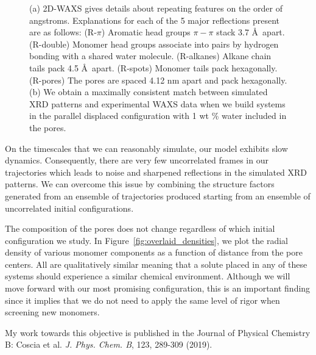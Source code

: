 \documentclass{article}
\begin{document}
\begin{figure}
\begin{subfigure}{0.49\linewidth}
	\end{subfigure}
    \caption{(a) 2D-WAXS gives details about repeating features on the order of
    angstroms. Explanations for each of the 5 major reflections present are
    as follows: (R-$\pi$) Aromatic head groups $\pi-\pi$ stack 3.7 \AA~apart. 
    (R-double) Monomer head groups associate into pairs by hydrogen bonding with
    a shared water molecule. (R-alkanes) Alkane chain tails pack 4.5 \AA~apart. 
    (R-spots) Monomer tails pack hexagonally. (R-pores) The pores are spaced 
    4.12 nm apart and pack hexagonally. (b) We obtain a maximally consistent
    match between simulated XRD patterns and experimental WAXS data when we
    build systems in the parallel displaced configuration with 1 wt \% water
    included in the pores.}\label{fig:WAXS_comparison}
    \vspace{-0.75cm}
 \end{figure}
 
  On the timescales that we can reasonably simulate, our model exhibits slow 
  dynamics. Consequently, there are very few uncorrelated frames in our 
  trajectories which leads to noise and sharpened reflections in the simulated
  XRD patterns. We can overcome this issue by combining the structure factors
  generated from an ensemble of trajectories produced starting from an ensemble
  of uncorrelated initial configurations.
 
  The composition of the pores does not change regardless of which
  initial configuration we study. In Figure~\ref{fig:overlaid_densities}, we 
  plot the radial density of various monomer components as a function of distance
  from the pore centers. All are qualitatively similar meaning that a solute 
  placed in any of these systems should experience a similar chemical environment.
  Although we will move forward with our most promising configuration, this is 
  an important finding since it implies that we do not need to apply the same level
  of rigor when screening new monomers.
  
  My work towards this objective is published in the Journal of Physical Chemistry B:
  Coscia et al. \textit{J. Phys. Chem. B}, 123, 289-309 (2019).
  
\end{document}
